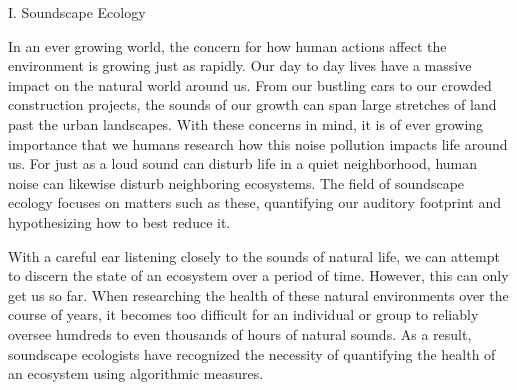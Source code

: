 \begin{center}
	I. Soundscape Ecology
\end{center}
\begin{flushleft}
\setlength{\parindent}{0.125in}In an ever growing world, the concern for how human actions affect the environment is growing just as rapidly. Our day to day lives have a massive impact on the natural world around us. From our bustling cars to our crowded construction projects, the sounds of our growth can span large stretches of land past the urban landscapes. With these concerns in mind, it is of ever growing importance that we humans research how this noise pollution impacts life around us. For just as a loud sound can disturb life in a quiet neighborhood, human noise can likewise disturb neighboring ecosystems. The field of soundscape ecology focuses on matters such as these, quantifying our auditory footprint and hypothesizing how to best reduce it.\par
\setlength{\parindent}{0.125in}With a careful ear listening closely to the sounds of natural life, we can attempt to discern the state of an ecosystem over a period of time. However, this can only get us so far. When researching the health of these natural environments over the course of years, it becomes too difficult for an individual or group to reliably oversee hundreds to even thousands of hours of natural sounds. As a result, soundscape ecologists have recognized the necessity of quantifying the health of an ecosystem using algorithmic measures.\par
\end{flushleft}